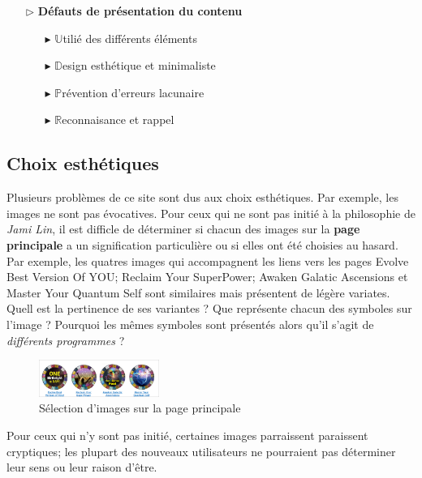 \documentclass[9pt]{report}
\newcommand{\mathpazott}{\fontfamily{pplj}\selectfont}
\renewcommand{\texttt}[1]{{\scriptsize\mathpazott #1}}
\begin{document}
\begin{multicols*}{2}
  \begin{itemize}
    \item [$\rhd$ ] \textbf{Défauts de présentation du contenu}  
      \begin{itemize}
        \item [$\blacktriangleright$ ] $\mathbb{U}$tilié des différents éléments 
        \item [$\blacktriangleright$ ] $\mathbb{D}$esign esthétique et minimaliste 
        \item [$\blacktriangleright$ ] $\mathbb{P}$révention d'erreurs lacunaire
        \item [$\blacktriangleright$ ] $\mathbb{R}$econnaisance et rappel
      \end{itemize}
  \end{itemize}
  \vspace{-1em}


  \subsection{Choix esthétiques}
  Plusieurs problèmes de ce site sont dus aux choix esthétiques. 
  Par exemple, les images ne sont pas évocatives. Pour ceux qui ne sont pas 
  initié à la philosophie de \textit{Jami Lin}, il est difficle de 
  déterminer si chacun des images sur la \textbf{page principale} a un signification 
  particulière ou si elles ont été choisies au hasard. Par exemple, 
  les quatres images qui accompagnent les liens vers les pages 
  \texttt{Evolve Best Version Of YOU}; \texttt{Reclaim Your SuperPower}; 
  \texttt{Awaken Galatic Ascensions} et \texttt{Master Your Quantum Self} sont 
  similaires mais présentent de légère variates. Quell est la pertinence de ses variantes ?
  Que représente chacun des symboles sur l'image ? Pourquoi les mêmes 
  symboles sont présentés alors qu'il s'agit de \textit{différents programmes} ?   
  \begin{figure}[H]
    \begin{center}
      \includegraphics[width=0.35\textwidth]{ImagesConfondantes.png}
    \end{center}
    \caption{Sélection d'images sur la page principale}
  \end{figure}

  Pour ceux qui n'y sont pas initié, certaines images parraissent paraissent 
  cryptiques; les plupart des nouveaux utilisateurs ne pourraient pas 
  déterminer leur sens ou leur raison d'être. 


\end{multicols*}
\end{document}
